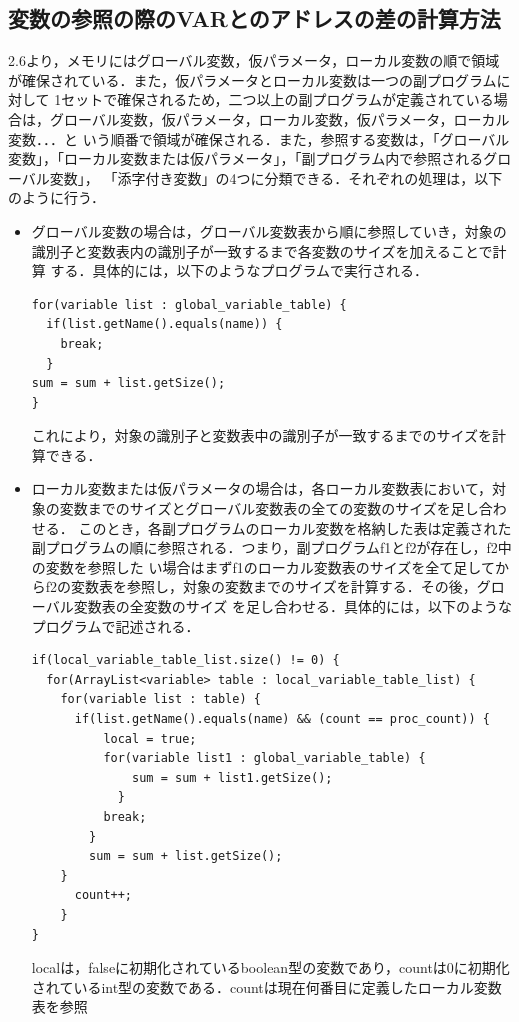 \documentclass[dvipdfmx]{jarticle}
\begin{document}
\subsection{変数の参照の際のVARとのアドレスの差の計算方法}
2.6より，メモリにはグローバル変数，仮パラメータ，ローカル変数の順で領域が確保されている．また，仮パラメータとローカル変数は一つの副プログラムに対して
1セットで確保されるため，二つ以上の副プログラムが定義されている場合は，グローバル変数，仮パラメータ，ローカル変数，仮パラメータ，ローカル変数．．．と
いう順番で領域が確保される．また，参照する変数は，「グローバル変数」，「ローカル変数または仮パラメータ」，「副プログラム内で参照されるグローバル変数」，
「添字付き変数」の4つに分類できる．それぞれの処理は，以下のように行う．
\begin{itemize}
  \item グローバル変数の場合は，グローバル変数表から順に参照していき，対象の識別子と変数表内の識別子が一致するまで各変数のサイズを加えることで計算
  する．具体的には，以下のようなプログラムで実行される．
  \begin{lstlisting}
for(variable list : global_variable_table) {
  if(list.getName().equals(name)) {
    break;
  }
sum = sum + list.getSize();
}
  \end{lstlisting}
  これにより，対象の識別子と変数表中の識別子が一致するまでのサイズを計算できる．
  \item ローカル変数または仮パラメータの場合は，各ローカル変数表において，対象の変数までのサイズとグローバル変数表の全ての変数のサイズを足し合わせる．
  このとき，各副プログラムのローカル変数を格納した表は定義された副プログラムの順に参照される．つまり，副プログラムf1とf2が存在し，f2中の変数を参照した
  い場合はまずf1のローカル変数表のサイズを全て足してからf2の変数表を参照し，対象の変数までのサイズを計算する．その後，グローバル変数表の全変数のサイズ
  を足し合わせる．具体的には，以下のようなプログラムで記述される．
  \begin{lstlisting}
if(local_variable_table_list.size() != 0) {
  for(ArrayList<variable> table : local_variable_table_list) {
    for(variable list : table) {
      if(list.getName().equals(name) && (count == proc_count)) {
          local = true;
          for(variable list1 : global_variable_table) {
              sum = sum + list1.getSize();
            }
          break;
        }
        sum = sum + list.getSize();
    }
      count++;
    }
}
  \end{lstlisting}
  localは，falseに初期化されているboolean型の変数であり，countは0に初期化されているint型の変数である．countは現在何番目に定義したローカル変数表を参照

\end{itemize}
\end{document}
